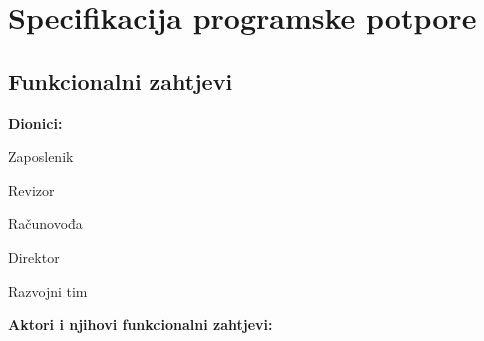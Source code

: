 \chapter{Specifikacija programske potpore}
		
	\section{Funkcionalni zahtjevi}

			
			\noindent \textbf{Dionici:}
			
			\begin{packed_enum}
				
				\item Zaposlenik
				\item Revizor
				\item Računovođa
				\item Direktor
				\item Razvojni tim
				
			\end{packed_enum}
			

			\noindent \textbf{Aktori i njihovi funkcionalni zahtjevi:}
			
